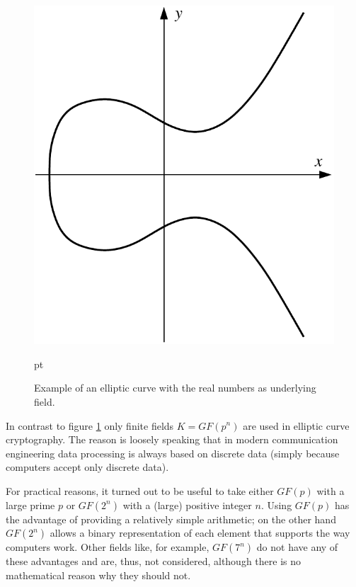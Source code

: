 \begin{figure}[ht]
\begin{center}
\includegraphics[scale=0.60]{figures/elliptic-curve}
\caption{Example of an elliptic curve with the real numbers as underlying field.\vspace{1ex}} 
\label{ExampleEllipticCurve}
\end{center}
 pt
\end{figure}

In contrast to figure \ref{ExampleEllipticCurve} only finite fields $K=GF(p^n)$ are used in elliptic curve cryptography. The reason is loosely speaking that in modern communication engineering data processing is always based on discrete data (simply because computers accept only discrete data).

For practical reasons, it turned out to be useful to take either $GF(p)$ with a large prime $p$ or $GF(2^n)$ with a (large) positive integer $n$. Using $GF(p)$ has the advantage of providing a relatively simple arithmetic; on the other hand $GF(2^n)$ allows a binary representation of each element that supports the way computers work. Other fields like, for example, $GF(7^n)$ do not have any of these advantages and are, thus, not considered, although there is no mathematical reason why they should not.

